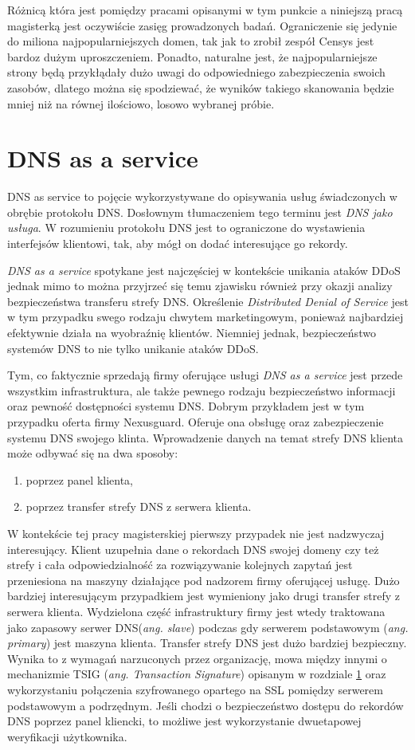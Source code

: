 Różnicą która jest pomiędzy pracami opisanymi w tym punkcie a niniejszą pracą magisterką jest oczywiście zasięg prowadzonych badań. Ograniczenie się jedynie do miliona najpopularniejszych domen, tak jak to zrobił zespół Censys\cite{censys} jest bardoz dużym uproszczeniem. Ponadto, naturalne jest, że najpopularniejsze strony będą przykłądały dużo uwagi do odpowiedniego zabezpieczenia swoich zasobów, dlatego można się spodziewać, że wyników takiego skanowania będzie mniej niż na równej ilościowo, losowo wybranej próbie. 

\section{DNS as a service}
DNS as service to pojęcie wykorzystywane do opisywania usług świadczonych w obrębie protokołu DNS. Dosłownym tłumaczeniem tego terminu jest \textit{DNS jako usługa}. W rozumieniu protokołu DNS jest to ograniczone do wystawienia interfejsów klientowi, tak, aby mógł on dodać interesujące go rekordy. 

\textit{DNS as a service} spotykane jest najczęściej w kontekście unikania ataków DDoS jednak mimo to można przyjrzeć się temu zjawisku również przy okazji analizy bezpieczeństwa transferu strefy DNS. Określenie \textit{Distributed Denial of Service} jest w tym przypadku swego rodzaju chwytem marketingowym, ponieważ najbardziej efektywnie działa na wyobraźnię klientów. Niemniej jednak, bezpieczeństwo systemów DNS to nie tylko unikanie ataków DDoS. 

Tym, co faktycznie sprzedają firmy oferujące usługi \textit{DNS as a service} jest przede wszystkim infrastruktura, ale także pewnego rodzaju bezpieczeństwo informacji oraz pewność dostępności systemu DNS. Dobrym przykładem jest w tym przypadku oferta firmy Nexusguard\cite{nexusguard}. Oferuje ona obsługę oraz zabezpieczenie systemu DNS swojego klinta. Wprowadzenie danych na temat strefy DNS klienta może odbywać się na dwa sposoby:
\begin{enumerate}
	\item poprzez panel klienta,
	\item poprzez transfer strefy DNS z serwera klienta.
\end{enumerate}
W kontekście tej pracy magisterskiej pierwszy przypadek nie jest nadzwyczaj interesujący. Klient uzupełnia dane o rekordach DNS swojej domeny czy też strefy i cała odpowiedzialność za rozwiązywanie kolejnych zapytań jest przeniesiona na maszyny działające pod nadzorem firmy oferującej usługę. Dużo bardziej interesującym przypadkiem jest wymieniony jako drugi transfer strefy z serwera klienta. Wydzielona część infrastruktury firmy jest wtedy traktowana jako zapasowy serwer DNS(\textit{ang. slave}) podczas gdy serwerem podstawowym (\textit{ang. primary}) jest maszyna klienta. Transfer strefy DNS jest dużo bardziej bezpieczny. Wynika to z wymagań narzuconych przez organizację, mowa między innymi o mechanizmie TSIG (\textit{ang. Transaction Signature})  opisanym w rozdziale \ref{} oraz wykorzystaniu połączenia szyfrowanego opartego na SSL pomiędzy serwerem podstawowym a podrzędnym. Jeśli chodzi o bezpieczeństwo dostępu do rekordów DNS poprzez panel kliencki, to możliwe jest wykorzystanie dwuetapowej weryfikacji użytkownika.

